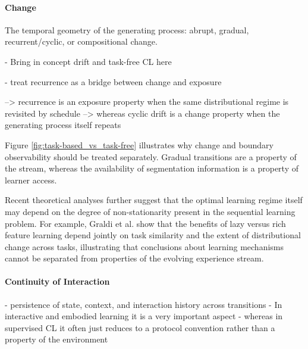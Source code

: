 \documentclass{article}
\begin{document}
    
            \paragraph{Change}

    
            The temporal geometry of the generating process: abrupt, gradual, recurrent/cyclic, or compositional change. 
            
            - Bring in concept drift and task-free CL here
            
            - treat recurrence as a bridge between change and exposure
            
            --> recurrence is an exposure property when the same distributional regime is revisited by schedule
            --> whereas cyclic drift is a change property when the generating process itself repeats
    

                Figure \ref{fig:task-based_vs_task-free} illustrates why change and boundary observability should be treated separately. Gradual transitions are a property of the stream, whereas the availability of segmentation information is a property of learner access.

            Recent theoretical analyses further suggest that the optimal learning regime itself may depend on the degree of non-stationarity present in the sequential learning problem. For example, Graldi et al. \cite{graldi2025importance} show that the benefits of lazy versus rich feature learning depend jointly on task similarity and the extent of distributional change across tasks, illustrating that conclusions about learning mechanisms cannot be separated from properties of the evolving experience stream.


            \paragraph{Continuity of Interaction}


            - persistence of state, context, and interaction history across transitions
            - In interactive and embodied learning it is a very important aspect
            - whereas in supervised CL it often just reduces to a protocol convention rather than a property of the environment
            
\end{document}
